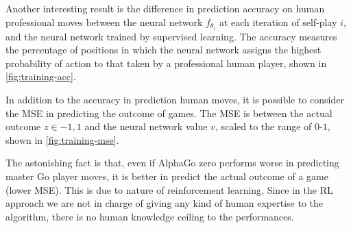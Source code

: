 \documentclass{article}
\begin{document}
Another interesting result is the difference in prediction accuracy on human professional moves between the neural network $f_{\theta_i}$ at each iteration of self-play $i$, and the neural network trained by supervised learning. The accuracy measures the percentage of positions in which the neural network assigns the highest probability of action to that taken by a professional human player, shown in \autoref{fig:training-acc}.

In addition to the accuracy in prediction human moves, it is possible to consider the MSE in predicting the outcome of games. The MSE is between the actual outcome $z \in {-1, 1}$ and the neural network value $v$, scaled to the range of $0$-$1$, shown in \autoref{fig:training-mse}.

The astonishing fact is that, even if AlphaGo zero performs worse in predicting master Go player moves, it is better in predict the actual outcome of a game (lower MSE). This is due to nature of reinforcement learning. Since in the RL approach we are not in charge of giving any kind of human expertise to the algorithm, there is no human knowledge ceiling to the performances.
\end{document}

